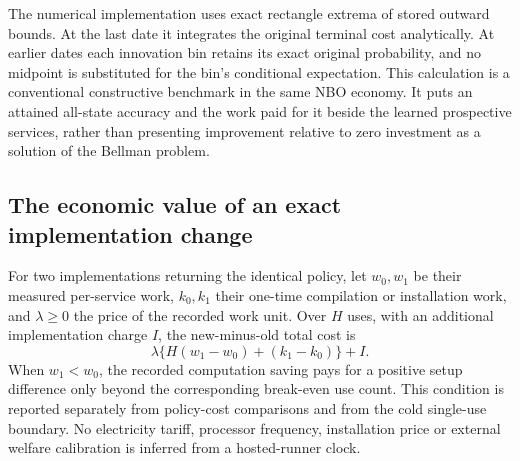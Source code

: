 The numerical implementation uses exact rectangle extrema of stored outward bounds. At the last date it integrates the original terminal cost analytically. At earlier dates each innovation bin retains its exact original probability, and no midpoint is substituted for the bin's conditional expectation. This calculation is a conventional constructive benchmark in the same NBO economy. It puts an attained all-state accuracy and the work paid for it beside the learned prospective services, rather than presenting improvement relative to zero investment as a solution of the Bellman problem.

\subsection{The economic value of an exact implementation change}
For two implementations returning the identical policy, let $w_0,w_1$ be their measured per-service work, $k_0,k_1$ their one-time compilation or installation work, and $\lambda\ge0$ the price of the recorded work unit. Over $H$ uses, with an additional implementation charge $I$, the new-minus-old total cost is
\[
 \lambda\{H(w_1-w_0)+(k_1-k_0)\}+I.
\]
When $w_1<w_0$, the recorded computation saving pays for a positive setup difference only beyond the corresponding break-even use count. This condition is reported separately from policy-cost comparisons and from the cold single-use boundary. No electricity tariff, processor frequency, installation price or external welfare calibration is inferred from a hosted-runner clock.
